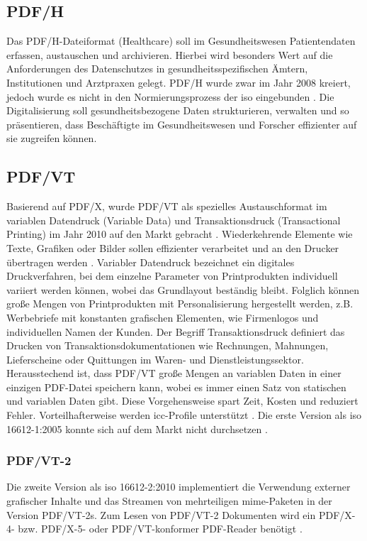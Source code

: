 \subsection{PDF/H}
Das PDF/H-Dateiformat (Healthcare) soll im Gesundheitswesen Patientendaten erfassen, austauschen und archivieren. Hierbei wird besonders Wert auf die Anforderungen des Datenschutzes in gesundheitsspezifischen Ämtern, Institutionen und Arztpraxen gelegt. PDF/H wurde zwar im Jahr 2008 kreiert, jedoch wurde es nicht in den Normierungsprozess der \gls{iso} eingebunden \cite{proj-consult}. Die Digitalisierung soll gesundheitsbezogene Daten strukturieren, verwalten und so präsentieren, dass Beschäftigte im Gesundheitswesen und Forscher effizienter auf sie zugreifen können.

\subsection{PDF/VT}
Basierend auf PDF/X, wurde PDF/VT als spezielles Austauschformat im variablen Datendruck (Variable Data) und Transaktionsdruck (Transactional Printing) im Jahr 2010 auf den Markt gebracht \cite{adobe-pdf-vt}. Wiederkehrende Elemente wie Texte, Grafiken oder Bilder sollen effizienter verarbeitet und an den Drucker übertragen werden \cite{adobe-pdf-e}. Variabler Datendruck bezeichnet ein digitales Druckverfahren, bei dem einzelne Parameter von Printprodukten individuell variiert werden können, wobei das Grundlayout beständig bleibt. Folglich können große Mengen von Printprodukten mit Personalisierung hergestellt werden, z.B. Werbebriefe mit konstanten grafischen Elementen, wie Firmenlogos und individuellen Namen der Kunden. Der Begriff Transaktionsdruck definiert das Drucken von Transaktionsdokumentationen wie Rechnungen, Mahnungen, Lieferscheine oder Quittungen im Waren- und Dienstleistungssektor. Herausstechend ist, dass PDF/VT große Mengen an variablen Daten in einer einzigen PDF-Datei speichern kann, wobei es immer einen Satz von statischen und variablen Daten gibt. Diese Vorgehensweise spart Zeit, Kosten und reduziert Fehler. Vorteilhafterweise werden \gls{icc}-Profile unterstützt \cite{adobe-pdf-vt}. Die erste Version als \gls{iso} 16612-1:2005 konnte sich auf dem Markt nicht durchsetzen \cite{proj-consult}.

\subsubsection{PDF/VT-2}
Die zweite Version als \gls{iso} 16612-2:2010 implementiert die Verwendung externer grafischer Inhalte und das Streamen von mehrteiligen \gls{mime}-Paketen in der Version PDF/VT-2s. Zum Lesen von PDF/VT-2 Dokumenten wird ein PDF/X-4- bzw. PDF/X-5- oder PDF/VT-konformer PDF-Reader benötigt \cite{proj-consult}.

